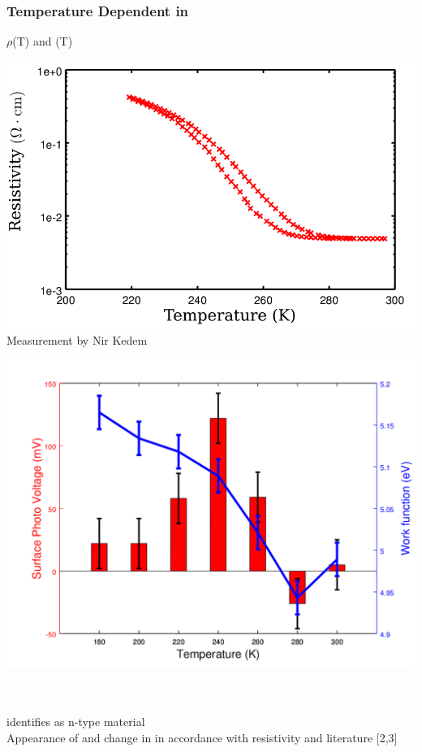 \documentclass{beamer}
\begin{document}
\begin{frame}
\frametitle{Temperature Dependent \spv{} in \wvadiox{}}
\begin{block}{$\rho$(T) and \spv{}(T)}
\centering
\begin{minipage}{0.45\linewidth}
\centering
	\includegraphics[width=1\linewidth]{./figs/pres/vo2resis}\\
	{\small Measurement by Nir Kedem}
\end{minipage}
\hfill
\begin{minipage}{0.45\linewidth}
\centering
	\includegraphics[width=1\linewidth]{./figs/pres/vox3}\\
\end{minipage}\\[5pt]\hrulefill\\
\spv{} identifies \wvadiox{} as n-type material\\
Appearance of \spv{} and change in \wf{} in accordance with resistivity and literature \textcolor{RUred}{[2,3]}
\end{block}\end{frame}
\end{document}
